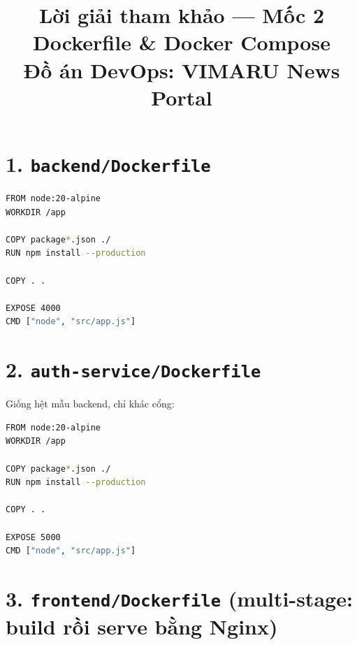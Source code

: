 \documentclass[a4paper,11pt]{article}
\title{\textbf{Lời giải tham khảo — Mốc 2}\\[4pt]
\large Dockerfile \& Docker Compose\\[2pt]
\normalsize Đồ án DevOps: VIMARU News Portal}
\author{}
\date{}
\begin{document}
\maketitle
\thispagestyle{fancy}

\begin{center}
\end{center}

\section*{1. \texttt{backend/Dockerfile}}

\begin{lstlisting}[language=bash]
FROM node:20-alpine
WORKDIR /app

COPY package*.json ./
RUN npm install --production

COPY . .

EXPOSE 4000
CMD ["node", "src/app.js"]
\end{lstlisting}

\section*{2. \texttt{auth-service/Dockerfile}}

Giống hệt mẫu backend, chỉ khác cổng:

\begin{lstlisting}[language=bash]
FROM node:20-alpine
WORKDIR /app

COPY package*.json ./
RUN npm install --production

COPY . .

EXPOSE 5000
CMD ["node", "src/app.js"]
\end{lstlisting}

\section*{3. \texttt{frontend/Dockerfile} (multi-stage: build rồi serve bằng Nginx)}
\end{document}
